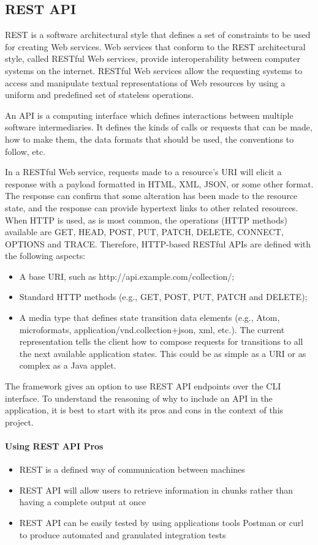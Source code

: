 \documentclass[thesis=M,english,hidelinks]{FITthesis}[2019/12/23]
\begin{document}
\subsection{REST API}

\gls{REST} is a software architectural style that defines a set of constraints to be used for creating Web services. Web services that conform to the REST architectural style, called RESTful Web services, provide interoperability between computer systems on the internet. RESTful Web services allow the requesting systems to access and manipulate textual representations of Web resources by using a uniform and predefined set of stateless operations.

An \gls{API} is a computing interface which defines interactions between multiple software intermediaries. It defines the kinds of calls or requests that can be made, how to make them, the data formats that should be used, the conventions to follow, etc.

In a RESTful Web service, requests made to a resource's URI will elicit a response with a payload formatted in HTML, XML, JSON, or some other format. The response can confirm that some alteration has been made to the resource state, and the response can provide hypertext links to other related resources. When HTTP is used, as is most common, the operations (HTTP methods) available are GET, HEAD, POST, PUT, PATCH, DELETE, CONNECT, OPTIONS and TRACE. Therefore, HTTP-based RESTful APIs are defined with the following aspects:

\begin{itemize}
	\item A base URI, such as http://api.example.com/collection/;
	\item Standard HTTP methods (e.g., GET, POST, PUT, PATCH and DELETE);
	\item A media type that defines state transition data elements (e.g., Atom, microformats, application/vnd.collection+json, xml, etc.). The current representation tells the client how to compose requests for transitions to all the next available application states. This could be as simple as a URI or as complex as a Java applet.
\end{itemize}


The framework gives an option to use REST API endpoints over the CLI interface. To understand the reasoning of why to include an API in the application, it is best to start with its pros and cons in the context of this project.

\paragraph{Using REST API Pros}
\begin{itemize}
	\item REST is a defined way of communication between machines
	\item REST API will allow users to retrieve information in chunks rather than having a complete output at once
	\item REST API can be easily tested by using applications tools Postman or curl to produce automated and granulated integration tests
\end{itemize}
\end{document}
